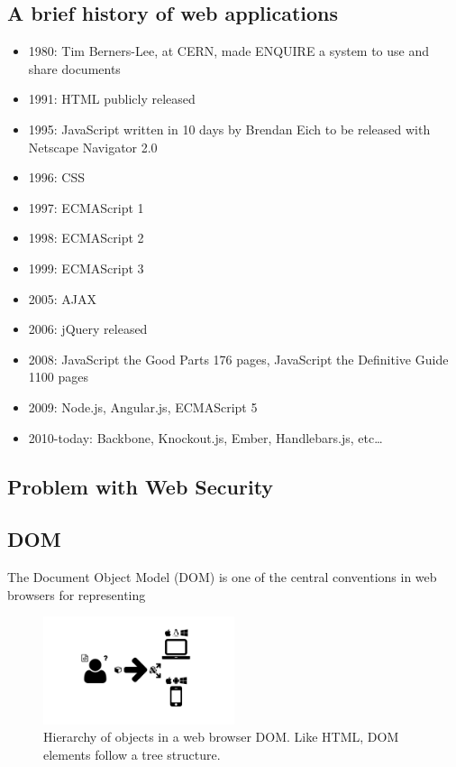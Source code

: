 \subsection{A brief history of web applications}
\autocite{w3c2014history}
\autocite{berners2014design}
\begin{itemize}
  \item 1980: Tim Berners-Lee, at CERN, made ENQUIRE a system to use and share documents
  \item 1991: HTML publicly released
  \item 1995: JavaScript written in 10 days by Brendan Eich to be released with Netscape Navigator 2.0
  \item 1996: CSS
  \item 1997: ECMAScript 1
  \item 1998: ECMAScript 2
  \item 1999: ECMAScript 3
  \item 2005: AJAX \autocite{garrett2005ajax}
  \item 2006: jQuery released
  \item 2008: JavaScript the Good Parts 176 pages, JavaScript the Definitive Guide 1100 pages
  \item 2009: Node.js, Angular.js, ECMAScript 5
  \item 2010-today: Backbone, Knockout.js, Ember, Handlebars.js, etc\ldots
\end{itemize}

\subsection{Problem with Web Security}

\autocite{grier2008secure}

\subsection{DOM}

The Document Object Model (DOM) is one of the central conventions in web browsers for representing

\begin{figure}
  \centering
  \includegraphics[width=0.5\textwidth, page=22, trim=0cm 0cm 11cm 0cm, clip=true]{images/Figures.pdf}
  \caption{Hierarchy of objects in a web browser DOM. Like HTML, DOM elements follow a tree structure.}
  \label{Figure:dom}
\end{figure}



